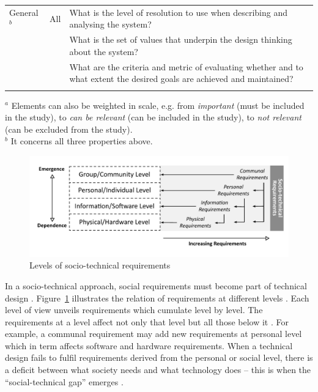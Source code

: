 \begin{table}
\begin{tabular}{>{\raggedright}p{2.2cm}>{\raggedright}p{2.8cm}p{6.3cm}}
General $^b$ & All  & What is the level of resolution to use when describing and analysing the system? \\
& & What is the set of values that underpin the design thinking about the system? \\
& & What are the criteria and metric of evaluating whether and to what extent the desired goals are achieved and maintained? \\
\noalign{\smallskip}\hline\noalign{\smallskip}
\end{tabular}
$^a$ Elements can also be weighted in scale, e.g. from \textit{important} (must be included in the study), to \textit{can be relevant} (can be included in the study), to \textit{not relevant} (can be excluded from the study).\\
$^b$ It concerns all three properties above. 
\end{table}
%
%
\begin{figure}
\sidecaption
\includegraphics[scale=.68]{img/sts_requirements.pdf}
\caption{Levels of socio-technical requirements \cite{Whitworth2009a}}
\label{fig:sts_requirements} 
\end{figure}
% 
%
In a socio-technical approach, social requirements must become part of technical design \cite{Whitworth2014}. Figure~\ref{fig:sts_requirements} illustrates the relation of requirements at different levels \cite{Whitworth2009a}. Each level of view unveils requirements which cumulate level by level. The requirements at a level affect not only that level but all those below it \cite{Whitworth2009a}. For example, a communal requirement may add new requirements at personal level which in term affects software and hardware requirements. When a technical design fails to fulfil requirements derived from the personal or social level, there is a deficit  between  what  society  needs  and  what technology does -- this is when the ``social-technical  gap''  emerges \cite{Whitworth2014}. 

